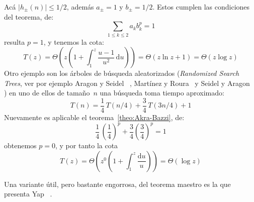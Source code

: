 \documentclass[english, spanish, fleqn, 10pt]{article}
\numberwithin{equation}{section}
\theoremstyle{definition}
\begin{document}
  Acá \(\lvert h_{\pm}(n) \rvert \le 1/2\),
  además \(a_{\pm} = 1\) y \(b_{\pm} = 1/2\).
  Estos cumplen las condiciones del teorema,
  de:
  \begin{equation*}
    \sum_{1 \le k \le 2} a_k b_k^p = 1
  \end{equation*}
  resulta \(p = 1\),
  y tenemos la cota:
  \begin{equation*}
    T(z)
      = \Theta
	  \left(
	    z \left(
	  1 + \int_1^z \frac{u - 1}{u^2} \, \mathrm{d} u
	      \right)
	  \right)
      = \Theta
	  \left(
	    z \ln z + 1
	  \right)
      = \Theta(z \log z)
  \end{equation*}
  Otro ejemplo son los árboles de búsqueda aleatorizados
  (\emph{\foreignlanguage{english}{Randomized Search Trees}},
   ver por ejemplo Aragon y Seidel~%
     \cite{aragon89:_random_search_tree},
   Martínez y Roura~%
     \cite{martinez98:_random_binar_searc_trees}
   y Seidel y Aragon~%
     \cite{seidel96:_random_search_trees})
  en uno de ellos de tamaño~\(n\)
  una búsqueda toma tiempo aproximado:
  \begin{equation*}
    T(n)
      = \frac{1}{4} \, T(n / 4) + \frac{3}{4} \, T(3 n / 4) + 1
  \end{equation*}
  Nuevamente es aplicable el teorema~\ref{theo:Akra-Bazzi},
  de:
  \begin{equation*}
    \frac{1}{4} \, \left(\frac{1}{4}\right)^p
	+ \frac{3}{4} \left(\frac{3}{4}\right)^p
      = 1
  \end{equation*}
  obtenemos \(p = 0\),
  y por tanto la cota
  \begin{equation*}
    T(z)
      = \Theta \left(
	  z^0 \left( 1 + \int_1^z \frac{\mathrm{d} u}{u} \right)
	\right)
      = \Theta ( \log z )
  \end{equation*}

  Una variante útil,
  pero bastante engorrosa,
  del teorema maestro
  es la que presenta Yap~%
    \cite{yap11:_elemen_approach_master_recurrences}.


\end{document}
